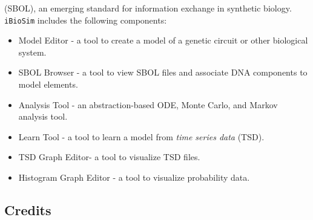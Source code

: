 \documentclass[titlepage,11pt]{article}
\begin{document}
(SBOL), an emerging standard for information exchange in synthetic biology.
{\tt iBioSim} includes the following components: 
\begin{itemize}
\item Model Editor - a tool to create a model of a genetic circuit or other biological system.
\item SBOL Browser - a tool to view SBOL files and associate DNA components to model elements.
\item Analysis Tool - an abstraction-based ODE, Monte Carlo, and Markov analysis tool.
\item Learn Tool - a tool to learn a model from \emph{time series data} (TSD).
\item TSD Graph Editor- a tool to visualize TSD files. 
\item Histogram Graph Editor - a tool to visualize probability data. 
\end{itemize}

\subsection*{Credits}
\end{document}
